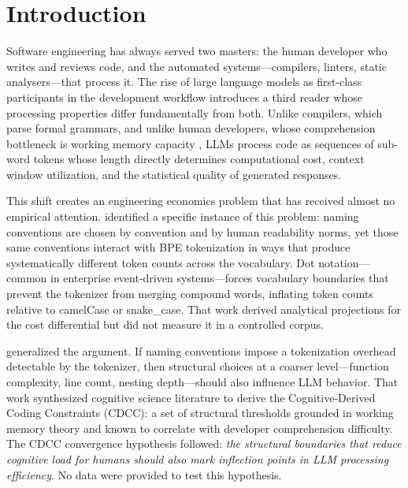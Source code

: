 \documentclass[11pt,a4paper]{article}
\begin{document}
\section{Introduction}

Software engineering has always served two masters: the human developer
who writes and reviews code, and the automated systems---compilers,
linters, static analysers---that process it. The rise of large language
models as first-class participants in the development workflow introduces a
third reader whose processing properties differ fundamentally from both.
Unlike compilers, which parse formal grammars, and unlike human developers,
whose comprehension bottleneck is working memory capacity
\citep{miller1956,cowan2001}, LLMs process code as sequences of
sub-word tokens whose length directly determines computational cost,
context window utilization, and the statistical quality of generated
responses.

This shift creates an engineering economics problem that has received almost
no empirical attention. \citet{pereira2026a} identified a specific instance of
this problem: naming conventions are chosen by convention and by human
readability norms, yet those same conventions interact with BPE tokenization
in ways that produce systematically different token counts across the
vocabulary. Dot notation---common in enterprise event-driven systems---forces
vocabulary boundaries that prevent the tokenizer from merging compound
words, inflating token counts relative to camelCase or snake\_case. That
work derived analytical projections for the cost differential but did not
measure it in a controlled corpus.

\citet{pereira2026b} generalized the argument. If naming conventions impose a
tokenization overhead detectable by the tokenizer, then structural choices
at a coarser level---function complexity, line count, nesting depth---should
also influence LLM behavior. That work synthesized cognitive science
literature to derive the Cognitive-Derived Coding Constraints (CDCC):
a set of structural thresholds grounded in working memory theory
\citep{miller1956,sweller1988,kahneman2011} and known to correlate with
developer comprehension difficulty. The CDCC convergence hypothesis
followed: \emph{the structural boundaries that reduce cognitive load for
humans should also mark inflection points in LLM processing efficiency}.
No data were provided to test this hypothesis.
\end{document}
